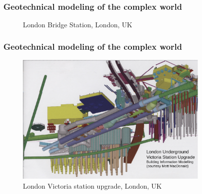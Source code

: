 \documentclass[notes]{beamer}
\begin{document}
\begin{frame}
\frametitle{Geotechnical modeling of the complex world}
\begin{figure}
	\caption*{London Bridge Station, London, UK}
\end{figure}
\end{frame}

\begin{frame}
\frametitle{Geotechnical modeling of the complex world}
\begin{figure}
	\includegraphics[width=0.85\textwidth]{figs/victoria-station.png}
	\caption{London Victoria station upgrade, London, UK}
\end{figure}
\end{frame}
\end{document}
